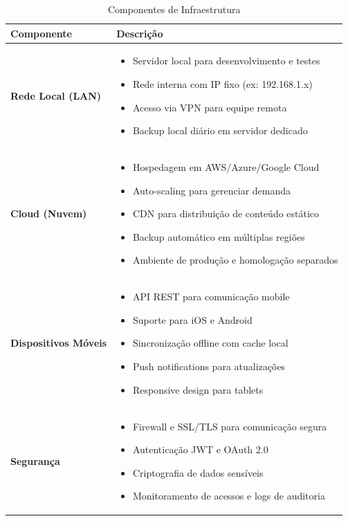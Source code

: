 \documentclass[11pt,a4paper]{article}
\begin{document}
\begin{table}[H]
\centering
\caption{Componentes de Infraestrutura}
\label{tab:infrastructure}
\begin{tabular}{|l|p{10cm}|}
\hline
\textbf{Componente} & \textbf{Descrição} \\
\hline
\textbf{Rede Local (LAN)} & 
\begin{itemize}[leftmargin=*, nosep]
    \item Servidor local para desenvolvimento e testes
    \item Rede interna com IP fixo (ex: 192.168.1.x)
    \item Acesso via VPN para equipe remota
    \item Backup local diário em servidor dedicado
\end{itemize} \\
\hline
\textbf{Cloud (Nuvem)} & 
\begin{itemize}[leftmargin=*, nosep]
    \item Hospedagem em AWS/Azure/Google Cloud
    \item Auto-scaling para gerenciar demanda
    \item CDN para distribuição de conteúdo estático
    \item Backup automático em múltiplas regiões
    \item Ambiente de produção e homologação separados
\end{itemize} \\
\hline
\textbf{Dispositivos Móveis} & 
\begin{itemize}[leftmargin=*, nosep]
    \item API REST para comunicação mobile
    \item Suporte para iOS e Android
    \item Sincronização offline com cache local
    \item Push notifications para atualizações
    \item Responsive design para tablets
\end{itemize} \\
\hline
\textbf{Segurança} & 
\begin{itemize}[leftmargin=*, nosep]
    \item Firewall e SSL/TLS para comunicação segura
    \item Autenticação JWT e OAuth 2.0
    \item Criptografia de dados sensíveis
    \item Monitoramento de acessos e logs de auditoria
\end{itemize} \\
\hline
\end{tabular}
\end{table}
\end{document}
